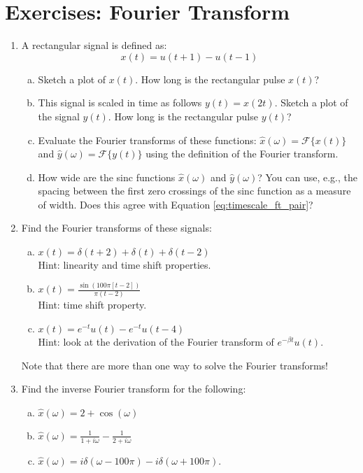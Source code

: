 \newpage
\section{Exercises: Fourier Transform}
\begin{enumerate}
\item A rectangular signal is defined as:
\begin{equation}
    x(t) = u\left(t+1\right)-u\left(t-1\right)
\end{equation}
\begin{enumerate}[a)]
\item Sketch a plot of $x(t)$. How long is the rectangular pulse $x(t)$?
\item This signal is scaled in time as follows $y(t) = x(2t)$. Sketch a plot of the signal $y(t)$. How long is the rectangular pulse $y(t)$?
\item Evaluate the Fourier transforms of these functions: $\hat{x}(\omega)=\mathcal{F}\{x(t)\}$ and $\hat{y}(\omega)=\mathcal{F}\{y(t)\}$ using the definition of the Fourier transform.
\item How wide are the sinc functions $\hat{x}(\omega)$ and $\hat{y}(\omega)$? You can use, e.g., the spacing between the first zero crossings of the sinc function as a measure of width. Does this agree with Equation \ref{eq:timescale_ft_pair}?
\end{enumerate}

\item Find the Fourier transforms of these signals:
\begin{enumerate}[a)]
\item $x(t)=\delta(t+2)+\delta(t)+\delta(t-2)$ \\Hint: linearity and time shift properties.
\item $x(t)=\frac{\sin(100\pi [t-2])}{\pi (t-2)}$ \\Hint: time shift property.
\item $x(t)=e^{-t}u(t) - e^{-t} u(t-4)$ \\Hint: look at the derivation of the Fourier transform of $e^{-\beta t} u(t)$.
\end{enumerate}
Note that there are more than one way to solve the Fourier transforms!

\item Find the inverse Fourier transform for the following:
\begin{enumerate}[a)]
\item $\hat{x}(\omega)= 2 + \cos(\omega)$
\item $\hat{x}(\omega) = \frac{1}{1+i\omega} - \frac{1}{2+i\omega}$
\item $\hat{x}(\omega) = i \delta(\omega - 100\pi) - i\delta(\omega + 100\pi)$.
\end{enumerate}


\end{enumerate}
